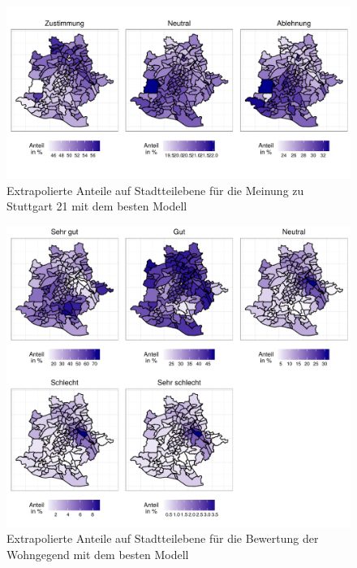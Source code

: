 \documentclass{Vorlage}
\begin{document}
\begin{appendix}

\begin{figure}[h]
 \begin{center}
 \includegraphics[scale=0.8]{Pictures/S21Extra}
 \caption{Extrapolierte Anteile auf Stadtteilebene für die Meinung zu Stuttgart 21 mit dem besten Modell}
 \label{S21Extra}
 \end{center}
\end{figure}

\begin{figure}[h]
 \begin{center}
 \includegraphics[scale=0.8]{Pictures/BWohnExtra}
 \caption{Extrapolierte Anteile auf Stadtteilebene für die Bewertung der Wohngegend mit dem besten Modell}
 \label{WohnExtra}
 \end{center}
\end{figure}


\end{appendix}
\end{document}
